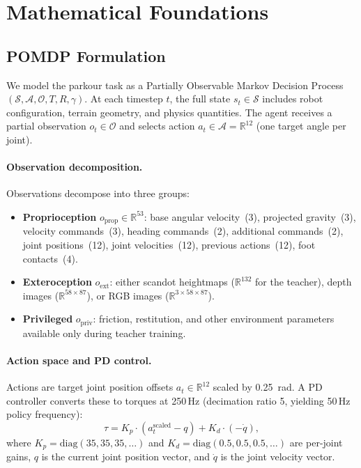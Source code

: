 \documentclass[10pt,twocolumn]{article}
\newcommand{\R}{\mathbb{R}}
\begin{document}
\section{Mathematical Foundations}
\label{sec:math}

\subsection{POMDP Formulation}

We model the parkour task as a Partially Observable Markov Decision
Process $(\mathcal{S}, \mathcal{A}, \mathcal{O}, T, R, \gamma)$.
At each timestep $t$, the full state $s_t \in \mathcal{S}$ includes
robot configuration, terrain geometry, and physics quantities.
The agent receives a partial observation $o_t \in \mathcal{O}$
and selects action $a_t \in \mathcal{A} = \R^{12}$ (one target angle
per joint).

\paragraph{Observation decomposition.}
Observations decompose into three groups:
\begin{itemize}
  \item \textbf{Proprioception} $o_\text{prop} \in \R^{53}$: base
    angular velocity~(3), projected gravity~(3), velocity
    commands~(3), heading commands~(2), additional commands~(2),
    joint positions~(12), joint velocities~(12), previous
    actions~(12), foot contacts~(4).
  \item \textbf{Exteroception} $o_\text{ext}$: either scandot
    heightmaps ($\R^{132}$ for the teacher), depth images
    ($\R^{58 \times 87}$), or RGB images ($\R^{3 \times 58 \times 87}$).
  \item \textbf{Privileged} $o_\text{priv}$: friction, restitution,
    and other environment parameters available only during teacher
    training.
\end{itemize}

\paragraph{Action space and PD control.}
Actions are target joint position offsets $a_t \in \R^{12}$ scaled
by 0.25~rad.  A PD controller converts these to torques at 250\,Hz
(decimation ratio 5, yielding 50\,Hz policy frequency):
\begin{equation}
  \tau = K_p \cdot (a_t^{\text{scaled}} - q) + K_d \cdot (-\dot{q}),
  \label{eq:pd}
\end{equation}
where $K_p = \text{diag}(35, 35, 35, \ldots)$ and $K_d = \text{diag}(0.5, 0.5, 0.5, \ldots)$
are per-joint gains, $q$ is the current joint position vector, and
$\dot{q}$ is the joint velocity vector.
\end{document}
